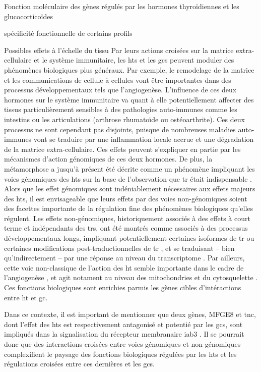 \documentclass[../main.tex]{subfiles}
\begin{document}
\begin{chapter}{Fonction moléculaire des gènes régulés par les hormones thyroïdiennes et les glucocorticoïdes}
\begin{section}{spécificité fonctionnelle de certains profils}
\begin{subsection}{Possibles effets à l’échelle du tissu}
Par leurs actions croisées sur la matrice extra-cellulaire et le système immunitaire, les \glspl{ht} et les \glspl{gc} peuvent moduler des phénomènes biologiques plus généraux.
Par exemple, le remodelage de la matrice et les communications de cellule à cellules vont être importantes dans des processus développementaux tels que l'angiogenèse.
L'influence de ces deux hormones sur le système immunitaire va quant à elle potentiellement affecter des tissus particulièrement sensibles à des pathologies auto-immunes comme les intestins ou les articulations (arthrose rhumatoïde ou ostéoarthrite).
Ces deux processus ne sont cependant pas disjoints, puisque de nombreuses maladies auto-immunes vont se traduire par une inflammation locale accrue et une dégradation de la matrice extra-cellulaire.
Ces effets peuvent s'expliquer en partie par les mécanismes d'action génomiques de ces deux hormones.
De plus, la métamorphose a jusqu'à présent été décrite comme un phénomène impliquant les voies génomiques des \glspl{ht} sur la base de l'observation que \gls{tr} était indispensable \citep{Das2010}.
Alors que les effet génomiques sont indéniablement nécessaires aux effets majeurs des \glspl{ht}, il est envisageable que leurs effets par des voies non-génomiques soient des facettes importante de la régulation fine des phénomènes biologiques qu'elles régulent. 
Les effets non-génomiques, historiquement associés à des effets à court terme et indépendants des \glspl{tr}, ont été montrés comme associés à des processus développementaux longs, impliquant potentiellement certaines isoformes de \gls{tr} ou certaines modifications post-traductionnelles de \gls{tr} \citep{Davis2005}, et se traduisant – bien qu'indirectement – par une réponse au niveau du transcriptome \citep{Davis2011}.
Par ailleurs, cette voie non-classique de l'action des \gls{ht} semble importante dans le cadre de l'angiogenèse \citep{Bergh2005}, et agit notament au niveau des mitochondries et du cytosquelette \citep{Leonard2006,Siegrist-Kaiser1990}.
Ces fonctions biologiques sont enrichies parmis les gènes cibles d'intéractions entre \gls{ht} et \gls{gc}.
\par
Dans ce contexte, il est important de mentionner que deux gènes, MFGE8 et \gls{tnc}, dont l'effet des \glspl{ht} est respectivement antagonisé et potentié par les \glspl{gc}, sont impliqués dans la signalisation du récepteur membranaire \gls{iab3} \citep{Sriramarao1993,Aziz2009}.
Il se pourrait donc que des interactions croisées entre voies génomiques et non-génomiques complexifient le paysage des fonctions biologiques régulées par les \glspl{ht} et les régulations croisées entre ces dernières et les \glspl{gc}.
\end{subsection}

\end{section}

\end{chapter}
\end{document}
